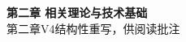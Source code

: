 

\frontmatter
\begin{center}
  {\Large\bfseries 第二章 相关理论与技术基础}\\[5pt]
  {\small 第二章V4结构性重写，供阅读批注}
\end{center}
\tableofcontents
\mainmatter
\setcounter{chapter}{1}


